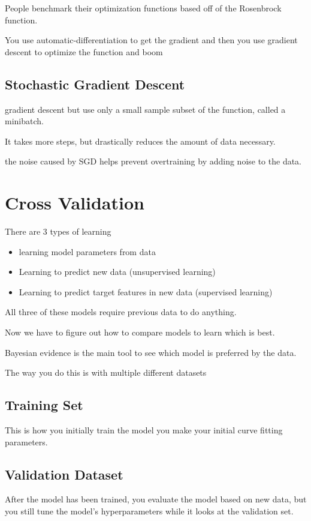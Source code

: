 \documentclass[fleqn]{report}
\begin{document}
People benchmark their optimization functions based off of 
the Rosenbrock function. 

You use automatic-differentiation to get the gradient and then 
you use gradient descent to optimize the function and boom 

\subsection{Stochastic Gradient Descent}
gradient descent but use only a small sample subset of the function, 
called a minibatch. 

It takes more steps, but drastically reduces the amount of data necessary. 

the noise caused by SGD helps prevent overtraining by 
adding noise to the data. 

\section{Cross Validation}
There are 3 types of learning 
\begin{itemize}
    \item 
    learning model parameters from data 
    \item 
    Learning to predict new data (unsupervised learning)
    \item 
    Learning to predict target features in new data (supervised learning)
\end{itemize}

All three of these models require previous data to do anything. 

Now we have to figure out how to compare models to learn which is best. 

Bayesian evidence is the main tool to see which model is preferred by 
the data. 

The way you do this is with multiple different datasets
 
\subsection{Training Set}
This is how you initially train the model you make your initial curve 
fitting parameters. 

\subsection{Validation Dataset}
After the model has been trained, you evaluate the model based on new data, 
but you still tune the model's hyperparameters while it looks at the validation set. 
\end{document}
